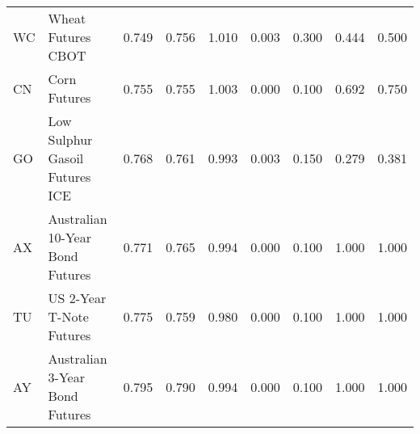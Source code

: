 \begin{longtable}{llrrrrrrr}
  WC &                                         Wheat Futures CBOT &        0.749 &       0.756 &     1.010 &        0.003 &           0.300 &                0.444 &      0.500 \\
  CN &                                               Corn Futures &        0.755 &       0.755 &     1.003 &        0.000 &           0.100 &                0.692 &      0.750 \\
  GO &                 \makecell{Low Sulphur Gasoil\\Futures ICE} &        0.768 &       0.761 &     0.993 &        0.003 &           0.150 &                0.279 &      0.381 \\
  AX &                \makecell{Australian 10-Year\\Bond Futures} &        0.771 &       0.765 &     0.994 &        0.000 &           0.100 &                1.000 &      1.000 \\
  TU &                       \makecell{US 2-Year T-Note\\Futures} &        0.775 &       0.759 &     0.980 &        0.000 &           0.100 &                1.000 &      1.000 \\
  AY &                 \makecell{Australian 3-Year\\Bond Futures} &        0.795 &       0.790 &     0.994 &        0.000 &           0.100 &                1.000 &      1.000 \\
\end{longtable}
